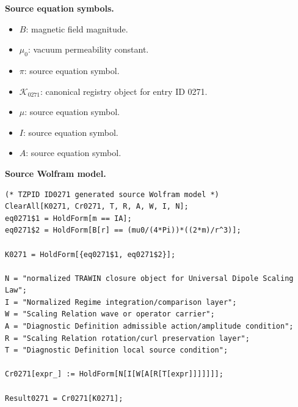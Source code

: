 \begin{minipage}[t]{0.49\linewidth}
\begingroup
\small
\raggedright
\textbf{Source equation symbols.}\par
\begin{itemize}[leftmargin=1.35em,itemsep=1pt,topsep=1pt,parsep=0pt]
    \item $B$: magnetic field magnitude.
    \item $\mu_0$: vacuum permeability constant.
    \item $\pi$: source equation symbol.
    \item $\mathcal{K}_{0271}$: canonical registry object for entry ID 0271.
    \item $\mu$: source equation symbol.
    \item $I$: source equation symbol.
    \item $A$: source equation symbol.
\end{itemize}
\endgroup
\end{minipage}\hfill
\begin{minipage}[t]{0.47\linewidth}
\begingroup
\scriptsize
\raggedright
\textbf{Source Wolfram model.}\par
\begin{Verbatim}[fontsize=\tiny,breaklines=true,breakanywhere=true]
(* TZPID ID0271 generated source Wolfram model *)
ClearAll[K0271, Cr0271, T, R, A, W, I, N];
eq0271$1 = HoldForm[m == IA];
eq0271$2 = HoldForm[B[r] == (mu0/(4*Pi))*((2*m)/r^3)];

K0271 = HoldForm[{eq0271$1, eq0271$2}];

N = "normalized TRAWIN closure object for Universal Dipole Scaling Law";
I = "Normalized Regime integration/comparison layer";
W = "Scaling Relation wave or operator carrier";
A = "Diagnostic Definition admissible action/amplitude condition";
R = "Scaling Relation rotation/curl preservation layer";
T = "Diagnostic Definition local source condition";

Cr0271[expr_] := HoldForm[N[I[W[A[R[T[expr]]]]]]];

Result0271 = Cr0271[K0271];
\end{Verbatim}
\endgroup
\end{minipage}

